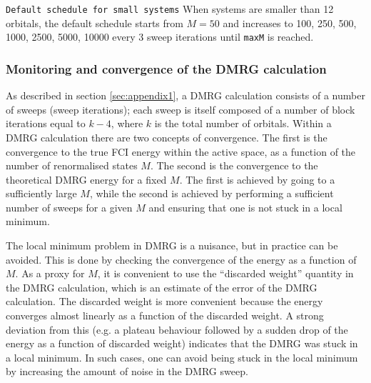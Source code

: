 \documentclass[letterpaper,12pt,aps, pra]{revtex4-1}
\begin{document}
\texttt{Default schedule for small systems} When systems are smaller than 12 orbitals, the default schedule starts from $M=50$ and increases to 100, 250, 500, 1000, 2500, 5000, 10000 every 3 sweep iterations until \texttt{maxM} is reached.

\subsubsection{Monitoring and convergence of the DMRG calculation}
\label{sec:dmrg_convergence}

As described in section \ref{sec:appendix1}, a DMRG calculation consists of a
number of sweeps (sweep iterations); each sweep is itself composed of a number
of block iterations equal to $k-4$, where $k$ is the total number of orbitals.
Within a DMRG calculation there are two concepts of convergence. The first is
the convergence to the true FCI energy within the active space, as a function
of the number of renormalised states $M$. The second is the convergence to the
theoretical DMRG energy for a fixed $M$. The first is achieved by going to a
sufficiently large $M$, while the second is achieved by performing a sufficient
number of sweeps for a given $M$ and ensuring that one is not stuck in a local
minimum.

The local minimum problem in DMRG is a nuisance, but in practice can be
avoided.  This is done by checking the convergence of the energy as a function
of $M$.  As a proxy for $M$, it is convenient to use the ``discarded weight''
quantity in the DMRG calculation, which is an estimate of the error of the DMRG
calculation. The discarded weight is more convenient because the energy
converges almost linearly as a function of the discarded weight. A strong
deviation from this (e.g. a plateau behaviour followed by a sudden drop of the
energy as a function of discarded weight) indicates that the DMRG was stuck in
a local minimum. In such cases, one can avoid being stuck in the local minimum
by increasing the amount of noise in the DMRG sweep.
\end{document}
